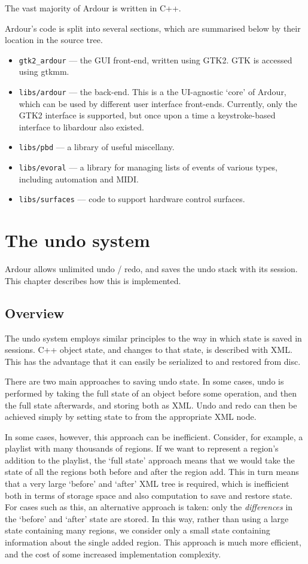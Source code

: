 \documentclass[10pt,a4paper]{book}
\newcommand{\code}[1]{\texttt{#1}}
\begin{document}
The vast majority of Ardour is written in C++.  

Ardour's code is split into several sections, which are summarised
below by their location in the source tree.

\begin{itemize}
\item \code{gtk2\_ardour} --- the GUI front-end, written using GTK2.
  GTK is accessed using gtkmm.
\item \code{libs/ardour} --- the back-end.  This is a the UI-agnostic
  `core' of Ardour, which can be used by different user interface
  front-ends.  Currently, only the GTK2 interface is supported, but
  once upon a time a keystroke-based interface to libardour also
  existed.
\item \code{libs/pbd} --- a library of useful miscellany.
\item \code{libs/evoral} --- a library for managing lists of events of
  various types, including automation and MIDI\@.
\item \code{libs/surfaces} --- code to support hardware control
  surfaces.
\end{itemize}

\chapter{The undo system}

Ardour allows unlimited undo / redo, and saves the undo stack with its
session.  This chapter describes how this is implemented.

\section{Overview}

The undo system employs similar principles to the way in which state
is saved in sessions.  C++ object state, and changes to that state, is
described with XML\@.  This has the advantage that it can easily be
serialized to and restored from disc.

There are two main approaches to saving undo state.  In some cases,
undo is performed by taking the full state of an object before some
operation, and then the full state afterwards, and storing both as
XML\@.  Undo and redo can then be achieved simply by setting state to
from the appropriate XML node.

In some cases, however, this approach can be inefficient.  Consider,
for example, a playlist with many thousands of regions.  If we want to
represent a region's addition to the playlist, the `full state'
approach means that we would take the state of all the regions both
before and after the region add.  This in turn means that a very large
`before' and `after' XML tree is required, which is inefficient both
in terms of storage space and also computation to save and restore
state.  For cases such as this, an alternative approach is taken: only
the \emph{differences} in the `before' and `after' state are stored.
In this way, rather than using a large state containing many regions,
we consider only a small state containing information about the single
added region.  This approach is much more efficient, and the cost of
some increased implementation complexity.
\end{document}
